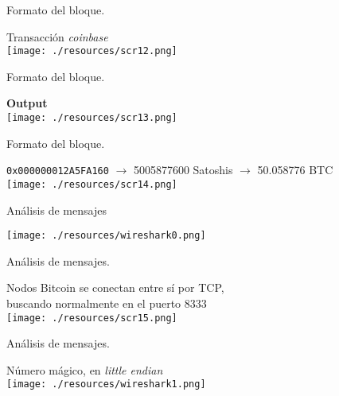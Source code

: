\documentclass[10pt, xcolor=table]{beamer}
\begin{document}
\begin{frame}{Formato del bloque. }
\begin{center}
Transacción \emph{coinbase}\\
\hspace{1cm}
	\texttt{[image: ./resources/scr12.png]}
\end{center}	
\end{frame}

\begin{frame}{Formato del bloque. }
\begin{center}
\Large{\textbf{Output}}\\
\hspace{1cm}
	\texttt{[image: ./resources/scr13.png]}
\end{center}	
\end{frame}

\begin{frame}{Formato del bloque. }
\begin{center}
\texttt{0x000000012A5FA160} $\longrightarrow$ 5005877600 Satoshis $\longrightarrow$ 50.058776 BTC \\
\hspace{1cm}
	\texttt{[image: ./resources/scr14.png]}
\end{center}	
\end{frame}

\begin{frame}{Análisis de mensajes}
\vspace{-0.3cm}
\begin{center}
	\texttt{[image: ./resources/wireshark0.png]}
\end{center}	
\end{frame}

\begin{frame}{Análisis de mensajes. }
\begin{center}
Nodos Bitcoin se conectan entre sí por TCP,\\buscando normalmente en el puerto 8333 \\
\hspace{1cm}
	\texttt{[image: ./resources/scr15.png]}
\end{center}	
\end{frame}

\begin{frame}{Análisis de mensajes. }
\begin{center}
Número mágico, en \emph{little endian} \\
\hspace{1cm}
	\texttt{[image: ./resources/wireshark1.png]}
\end{center}	
\end{frame}
\end{document}
